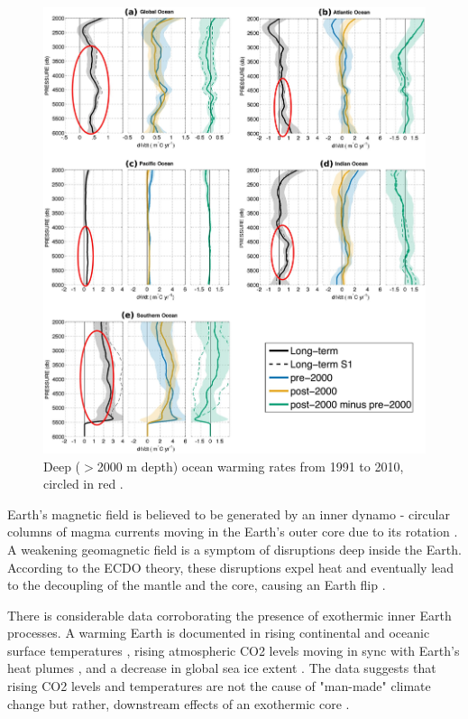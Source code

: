\documentclass[10pt,twocolumn,letterpaper]{article}
\begin{document}
\begin{figure}[t]
\begin{center}
   \includegraphics[width=1\linewidth]{ocean-highlight.jpg}
\end{center}
   \caption{Deep ($>$2000 m depth) ocean warming rates from 1991 to 2010, circled in red \cite{132}.}
\label{fig:15}
\label{fig:onecol}
\end{figure}

Earth's magnetic field is believed to be generated by an inner dynamo - circular columns of magma currents moving in the Earth's outer core due to its rotation \cite{123}. A weakening geomagnetic field is a symptom of disruptions deep inside the Earth. According to the ECDO theory, these disruptions expel heat and eventually lead to the decoupling of the mantle and the core, causing an Earth flip \cite{1}.

There is considerable data corroborating the presence of exothermic inner Earth processes. A warming Earth is documented in rising continental and oceanic surface temperatures \cite{127,128}, rising atmospheric CO2 levels moving in sync with Earth's heat plumes \cite{129,130}, and a decrease in global sea ice extent \cite{131}. The data suggests that rising CO2 levels and temperatures are not the cause of "man-made" climate change but rather, downstream effects of an exothermic core \cite{129}.
\end{document}
